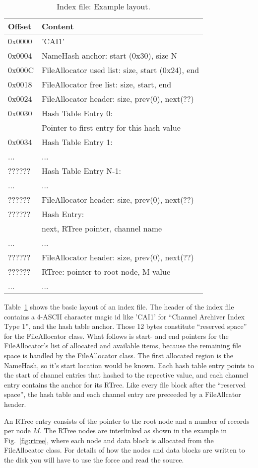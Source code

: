 \begin{table}[htbp]
  \begin{center}
    \begin{tabular}{ll}
     Offset  & Content \\
     \hline
     0x0000  & 'CAI1' \\
     0x0004  & NameHash anchor: start (0x30), size N \\
     0x000C  & FileAllocator used list: size, start (0x24), end \\
     0x0018  & FileAllocator free list: size, start, end \\
     0x0024  & FileAllocator header: size, prev(0), next(??) \\
     0x0030  & Hash Table Entry 0: \\
             & Pointer to first entry for this hash value \\
     0x0034  & Hash Table Entry 1:  \\
     ...     & ... \\
     ??????  & Hash Table Entry N-1:  \\
     ...     & ... \\
     ??????  & FileAllocator header: size, prev(0), next(??) \\
     ??????  & Hash Entry: \\
             & next, RTree pointer, channel name \\
     ...     & ... \\  
     ??????  & FileAllocator header: size, prev(0), next(??) \\
     ??????  & RTree: pointer to root node, M value \\
     ...     & ... \\  
    \end{tabular}
    \caption{Index file: Example layout.}
    \label{tab:indexfile}
  \end{center}
\end{table}

\noindent Table~\ref{tab:indexfile} shows the basic layout of an index file.
The header of the index file contains a 4-ASCII character magic id
like 'CAI1' for ``Channel Archiver Index Type 1'',
and the hash table anchor.
Those 12 bytes constitute ``reserved space'' for the FileAllocator
class. What follows is start- and end pointers for the FileAllocator's
list of allocated and available items, because the remaining file space is
handled by the FileAllocator class.
The first allocated region is the NameHash, so it's start location
would be known. Each hash table entry points to the start of channel
entries that hashed to the repective value, and each channel entry
contains the anchor for its RTree. Like every file block after the
``reserved space'', the hash table and each channel entry are preceeded
by a FileAllcator header.

An RTree entry consists of the pointer to the root node and a number
of records per node $M$. The RTree nodes are interlinked as shown in
the example in Fig.~\ref{fig:rtree}, where each node and data block is
allocated from the FileAllocator class. For details of how the nodes
and data blocks are written to the disk you will have to use the force
and read the source.
